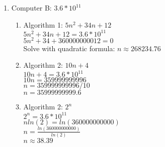 \documentclass[11pt]{article}
\begin{document}
\begin{enumerate}
\begin{enumerate}[label=(\alph*)]
    \item 
    Computer B: $3.6 * 10^{11}$
    \begin{enumerate}[label=(\alph*)]
        \item 
        Algorithm 1: $5n^2+34n+12$ \\
        $5n^2+34n+12 = 3.6*10^{11}$ \\
        $5n^2+34+360000000012 = 0$ \\
        Solve with quadratic formula: $n \approx 268234.76$
        \item 
        Algorithm 2: $10n + 4$ \\
        $10n+4 = 3.6*10^{11}$\\
        $10n = 359999999996$\\
        $n = 359999999996/10$ \\
        $n = 35999999999.6$
        \item 
        Algorithm 2: $2^n$\\
        $2^n = 3.6 * 10^{11}$\\
        $nln(2) = ln(360000000000)$\\
        $n = \frac{ln(360000000000)}{ln(2)}$\\
        $n \approx 38.39$
    \end{enumerate}
\end{enumerate}
\end{enumerate}
\end{document}
